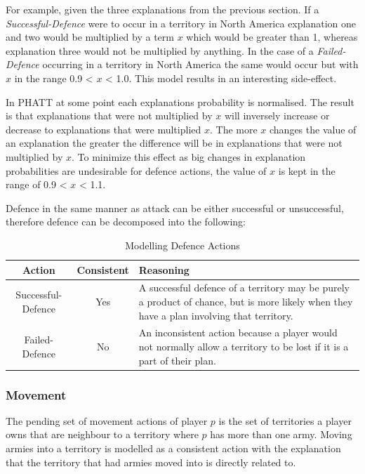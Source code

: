 \documentclass[parskip]{cs4rep}
\begin{document}
For example, given the three explanations from the previous section. If a \textit{Successful-Defence} were to occur in a territory in North America explanation one and two would be multiplied by a term $x$ which would be greater than 1, whereas explanation three would not be multiplied by anything. In the case of a \textit{Failed-Defence} occurring in a territory in North America the same would occur but with $x$ in the range 0.9 < $x$ < 1.0. This model results in an interesting side-effect.

In PHATT at some point each explanations probability is normalised. The result is that explanations that were not multiplied by $x$ will inversely increase or decrease to explanations that were multiplied $x$. The more $x$ changes the value of an explanation the greater the difference will be in explanations that were not multiplied by $x$. To minimize this effect as big changes in explanation probabilities are undesirable for defence actions, the value of $x$ is kept in the range of 0.9 < $x$ < 1.1.

Defence in the same manner as attack can be either successful or unsuccessful, therefore defence can be decomposed into the following: 

\begin{table}[ht]
\centering
\begin{tabular}{|c|c|p{8cm}|}
\hline 
\textbf{Action} & \textbf{Consistent}  & \textbf{Reasoning} \\ 
\hline 
Successful-Defence & Yes & A successful defence of a territory may be purely a product of chance, but is more likely when they have a plan involving that territory. \\ 
\hline 
Failed-Defence & No & An inconsistent action because a player would not normally allow a territory to be lost if it is a part of their plan. \\ 
\hline
\end{tabular}
\caption{Modelling Defence Actions}
\label{table:attack-defend-modelling}
\end{table}

\subsubsection{Movement}

The pending set of movement actions of player $p$ is the set of territories a player owns that are neighbour to a territory where $p$ has more than one army. Moving armies into a territory is modelled as a consistent action with the explanation that the territory that had armies moved into is directly related to.
\end{document}
